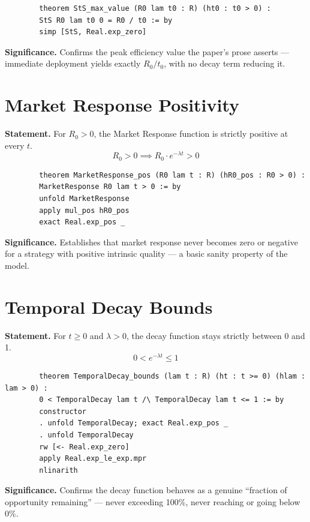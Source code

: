 \documentclass[11pt,a4paper]{article}
\begin{document}
	\begin{lstlisting}
		theorem StS_max_value (R0 lam t0 : R) (ht0 : t0 > 0) :
		StS R0 lam t0 0 = R0 / t0 := by
		simp [StS, Real.exp_zero]
	\end{lstlisting}
	
	\noindent\textbf{Significance.} Confirms the peak efficiency value the paper's prose asserts --- immediate deployment yields exactly $R_0/t_0$, with no decay term reducing it.
	
	\section{Market Response Positivity}
	
	\textbf{Statement.} For $R_0 > 0$, the Market Response function is strictly positive at every $t$.
	\begin{equation}
		R_0 > 0 \implies R_0 \cdot e^{-\lambda t} > 0
	\end{equation}
	
	\begin{lstlisting}
		theorem MarketResponse_pos (R0 lam t : R) (hR0_pos : R0 > 0) :
		MarketResponse R0 lam t > 0 := by
		unfold MarketResponse
		apply mul_pos hR0_pos
		exact Real.exp_pos _
	\end{lstlisting}
	
	\noindent\textbf{Significance.} Establishes that market response never becomes zero or negative for a strategy with positive intrinsic quality --- a basic sanity property of the model.
	
	\section{Temporal Decay Bounds}
	
	\textbf{Statement.} For $t \geq 0$ and $\lambda > 0$, the decay function stays strictly between 0 and 1.
	\begin{equation}
		0 < e^{-\lambda t} \leq 1
	\end{equation}
	
	\begin{lstlisting}
		theorem TemporalDecay_bounds (lam t : R) (ht : t >= 0) (hlam : lam > 0) :
		0 < TemporalDecay lam t /\ TemporalDecay lam t <= 1 := by
		constructor
		. unfold TemporalDecay; exact Real.exp_pos _
		. unfold TemporalDecay
		rw [<- Real.exp_zero]
		apply Real.exp_le_exp.mpr
		nlinarith
	\end{lstlisting}
	
	\noindent\textbf{Significance.} Confirms the decay function behaves as a genuine ``fraction of opportunity remaining'' --- never exceeding 100\%, never reaching or going below 0\%.
	
\end{document}
